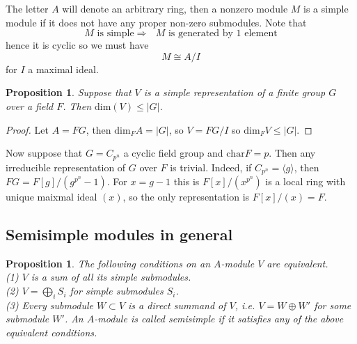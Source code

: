\documentclass{article}
\theoremstyle{definition}
\theoremstyle{remark}
\theoremstyle{plain}
\newtheorem{proposition}[theorem]{Proposition}
\begin{document}
The letter $A$ will denote an arbitrary ring, then a nonzero module $M$ is a simple module if it does not have any proper non-zero submodules.
Note that
\[ \text{$M$ is simple} \Longrightarrow \text{ $M$ is generated by 1 element}\]
hence it is cyclic so we must have
\[M \cong A/I\]
for $I$ a maximal ideal.

\begin{proposition}
	Suppose that $V$ is a simple representation of a finite group $G$ over  a field $F$. Then $\text{dim}(V) \leq |G|$. 
\end{proposition}
 \begin{proof}
	 Let $A = FG$, then $\text{dim}_F A = |G|$, so $V = FG/I$ so $\text{dim}_F V \leq |G|$.
 \end{proof}
 
 Now suppose that $G = C_{p^n}$ a cyclic field group and $\text{char} F = p$.
 Then any irreducible representation of $G$ over $F$ is trivial. 
 Indeed, if $C_{p^n} = \langle g \rangle$, then $FG = F[g]/(g^{p^n}-1)$.
 For $x = g-1$ this is $F[x]/(x^{p^n})$ is a local ring with unique maixmal ideal $(x)$, so the only representation is $F[x]/(x) = F$.

 \subsection{Semisimple modules in general}

 \begin{proposition}
	 The following conditions on an $A$-module $V$ are equivalent.\\
	 \indent (1) $V$ is a sum of all its simple submodules.\\
	 \indent (2) $V = \bigoplus_i S_i$ for simple submodules $S_i$.\\
	 \indent (3) Every submodule $W \subset V$ is a direct summand of $V$, i.e. $V = W \oplus W'$ for some submodule $W'$.
	 An $A$-module is called \textit{semisimple} if it satisfies any of the above equivalent conditions.
 \end{proposition}
 
\end{document}
